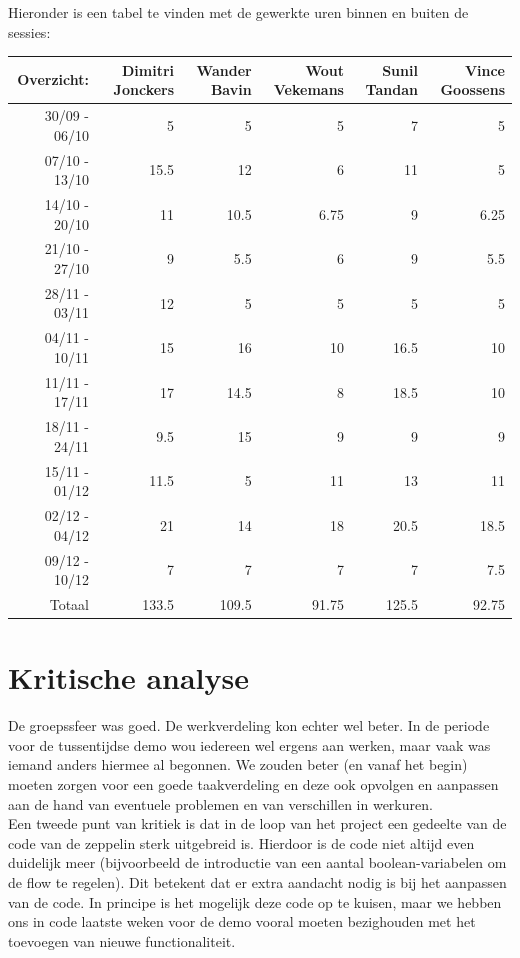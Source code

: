 \documentclass[eind]{penoverslag}
\begin{document}
Hieronder is een tabel te vinden met de gewerkte uren binnen en buiten de sessies: \\

\begin{tabular}{r||r|r|r|r|r}
Overzicht: & Dimitri Jonckers & Wander Bavin & Wout Vekemans & Sunil Tandan & Vince Goossens \\
\hline \hline
30/09 - 06/10 & 5 & 5 & 5 & 7 & 5 \\
07/10 - 13/10 & 15.5 & 12 & 6 & 11 & 5 \\
14/10 - 20/10 & 11 & 10.5 & 6.75 & 9 & 6.25 \\
21/10 - 27/10 & 9 & 5.5 & 6 & 9 & 5.5 \\
28/11 - 03/11 & 12 & 5 & 5 & 5 & 5 \\
04/11 - 10/11 & 15 & 16 & 10 & 16.5 & 10 \\
11/11 - 17/11 & 17 & 14.5 & 8 & 18.5 & 10 \\
18/11 - 24/11 & 9.5 & 15 & 9 & 9 & 9 \\
15/11 - 01/12 & 11.5 & 5 & 11 & 13 & 11 \\
02/12 - 04/12 & 21 & 14 & 18 & 20.5 & 18.5 \\
09/12 - 10/12 & 7 & 7 & 7 & 7 & 7.5 \\
\hline \hline
Totaal & 133.5 & 109.5 & 91.75 & 125.5 & 92.75 \\
\end{tabular}

\section{Kritische analyse}
De groepssfeer was goed. De werkverdeling kon echter wel beter. In de periode voor de tussentijdse demo wou iedereen wel ergens aan werken, maar vaak was iemand anders hiermee al begonnen. We zouden beter (en vanaf het begin) moeten zorgen voor een goede taakverdeling en deze ook opvolgen en aanpassen aan de hand van eventuele problemen en van verschillen in werkuren. \\
Een tweede punt van kritiek is dat in de loop van het project een gedeelte van de code van de zeppelin sterk uitgebreid is. Hierdoor is de code niet altijd even duidelijk meer (bijvoorbeeld de introductie van een aantal boolean-variabelen om de flow te regelen). Dit betekent dat er extra aandacht nodig is bij het aanpassen van de code. In principe is het mogelijk deze code op te kuisen, maar we hebben ons in code laatste weken voor de demo vooral moeten bezighouden met het toevoegen van nieuwe functionaliteit. \\
\end{document}
